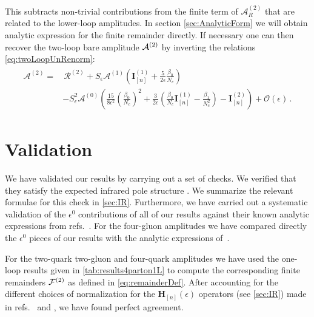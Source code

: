 This subtracts non-trivial contributions from
the finite term of $\mathcal{A}_R^{(2)}$ that are related to 
the lower-loop amplitudes.
In section \ref{sec:AnalyticForm} we will obtain analytic expression for the finite remainder directly.
If necessary one can then recover the two-loop bare amplitude $\mathcal{A}^{(2)}$ by inverting
the relations \eqref{eq:twoLoopUnRenorm}:
\begin{align}
  \begin{split}
    \label{eq:ampFromRem}
    {\mathcal{A}}^{(2)}=&\,\mathcal{R}^{(2)}+
    S_\epsilon{\mathcal{A}}^{(1)}
    \left(\mathbf{I}_{[n]}^{(1)}+\frac{5}{2\epsilon}
    \frac{\beta_0}
    {N_c}\right)\\
    &-S_\epsilon^2 {\mathcal{A}}^{(0)}
    \left(
    \frac{15}{8\epsilon^2}
    \left(\frac{\beta_0}{N_c}\right)^2+\frac{3}{2\epsilon}
    \left(\frac{\beta_0}{N_c}\mathbf{I}_{[n]}^{(1)}-
    \frac{\beta_1}{N_c^2}\right)-\mathbf{I}_{[n]}^{(2)}
    \right)+\mathcal{O}(\epsilon)\,.
  \end{split}
\end{align}



\section{Validation}
\label{sec:Validation-5parton}

We have validated our results by carrying out a set of
checks. We verified that they satisfy the
expected infrared pole structure \cite{Catani:1998bh}. We summarize the
relevant formulae for this check in \cref{sec:IR}.
Furthermore, we have carried out a systematic
validation of the $\epsilon^0$ contributions of all of 
our results against their known analytic
expressions from refs.~\cite{Bern:2002tk,Bern:2003ck,
DeFreitas:2004kmi,Glover:2004si}. 
For the four-gluon amplitudes we have compared directly the
$\epsilon^0$ pieces of our results with the analytic expressions
of~\cite{Bern:2002tk}.

For the two-quark two-gluon and four-quark amplitudes we have used the one-loop results given in \cref{tab:results4parton1L}
to compute the corresponding finite remainders $\mathcal{F}^{(2)}$ as
defined in \cref{eq:remainderDef}. 
After accounting for the different choices of 
normalization for the $\mathbf{H}_{[n]}(\epsilon)$ operators 
(see \cref{sec:IR})
made in refs.~\cite{Bern:2003ck} and \cite{Glover:2004si},
we have found perfect agreement.

